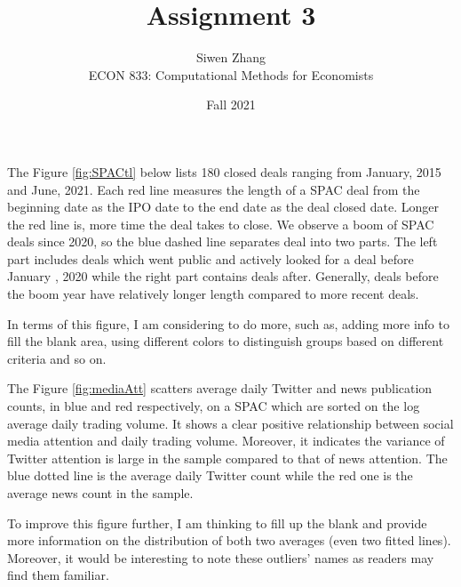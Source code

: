 \documentclass[a4paper,12pt]{article}
\newenvironment{problem}[2][Problem]{\begin{trivlist}
\item[\hskip \labelsep {\bfseries #1}\hskip \labelsep {\bfseries #2.}]}{\end{trivlist}}
\begin{document}
\title{Assignment 3}
\author{Siwen Zhang \\
ECON 833: Computational Methods for Economists}
\date{Fall 2021}
\maketitle


\begin{problem}{1. SPACs Deal Timelines}
	The Figure \ref{fig:SPACtl} below lists 180 closed deals ranging from January, 2015 and June, 2021. Each red line measures the length of a SPAC deal from the beginning date as the IPO date to the end date as the deal closed date. Longer the red line is, more time the deal takes to close. We observe a boom of SPAC deals since 2020, so the blue dashed line separates deal into two parts. The left part includes deals which went public and actively looked for a deal before January , 2020 while the right part contains deals after. Generally, deals before the boom year have relatively longer length compared to more recent deals.\par
	In terms of this figure, I am considering to do more, such as, adding more info to fill the blank area, using different colors to distinguish groups based on different criteria and so on.
\end{problem}


\begin{problem}{2. Daily Average Media Attention and Trading Volume}
	The Figure \ref{fig:mediaAtt} scatters  average daily Twitter and news publication counts, in blue and red respectively, on a SPAC which are sorted on the log average daily trading volume. It shows a clear positive relationship between social media attention and daily trading volume. Moreover, it indicates the variance of Twitter attention is large in the sample compared to that of news attention. The blue dotted line is the average daily Twitter count while the red one is the average news count in the sample.\par
	To improve this figure further, I am thinking to fill up the blank and provide more information on the distribution of both two averages (even two fitted lines). Moreover, it would be interesting to note these outliers' names as readers may find them familiar.
\end{problem}
\end{document}
